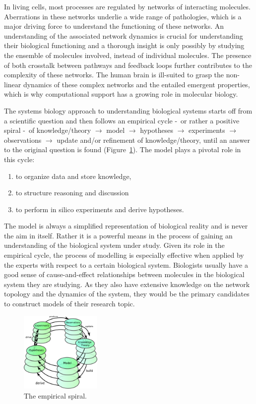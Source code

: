 In living cells, most processes are regulated by networks of interacting molecules.
Aberrations in these networks underlie a wide range of pathologies,
which is a major driving force to understand the functioning of these networks.
An understanding of the associated network dynamics is crucial for understanding
their biological functioning and a thorough insight is only possibly by studying
the ensemble of molecules involved, instead of individual molecules.
The presence of both crosstalk between pathways and feedback loops further contributes to the complexity
of these networks.
The human brain is ill-suited to grasp the non-linear dynamics of these complex networks and
the entailed emergent properties, which is why computational support has a growing role in molecular biology.

The systems biology approach to understanding biological systems starts off from a
scientific question and then follows an empirical cycle \--\ or rather a positive spiral \--\ of
knowledge/theory $\rightarrow$ model $\rightarrow$ hypotheses $\rightarrow$ experiments $\rightarrow$
observations $\rightarrow$ update and/or refinement of knowledge/theory,
until an answer to the original question is found (Figure~\ref{fig:empirical-spiral}).
The model plays a pivotal role in this cycle:
\begin{enumerate}
  \item to organize data and store knowledge,
  \item to structure reasoning  and discussion
  \item to perform in silico experiments and derive hypotheses.
\end{enumerate}
The model is always a simplified representation of biological reality and is never the aim in itself.
Rather it is a powerful means in the process of gaining an understanding of the biological system
under study. Given its role in the empirical cycle, the process of modelling is especially effective
when applied by the experts with respect to a certain biological system. Biologists usually have a good
sense of cause-and-effect relationships between molecules in the biological system they are studying.
As they also have extensive knowledge on the network topology and the dynamics of the system, they
would be the primary candidates to construct models of their research topic.

\begin{figure}[!htb]
  \centering
  \includegraphics[width=0.35\textwidth]{images/empirical_spiral4}
 \caption{The empirical spiral.}\label{fig:empirical-spiral}
\end{figure}


